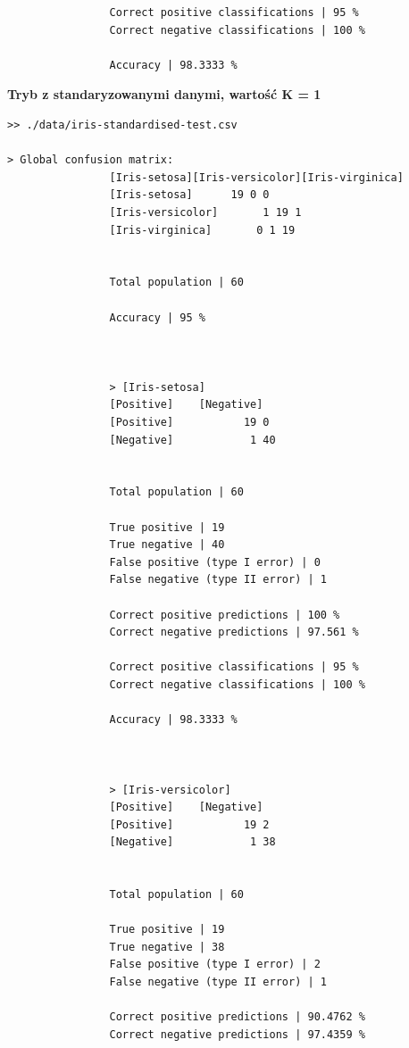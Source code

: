 \documentclass{classrep}
\begin{document}
{{{\begin{lstlisting}
                Correct positive classifications | 95 %
                Correct negative classifications | 100 %

                Accuracy | 98.3333 %

                \end{lstlisting}
                \textbf{Tryb z standaryzowanymi danymi, wartość K = 1}
                \begin{lstlisting}
>> ./data/iris-standardised-test.csv

> Global confusion matrix:
                [Iris-setosa][Iris-versicolor][Iris-virginica]
                [Iris-setosa]      19 0 0
                [Iris-versicolor]       1 19 1
                [Iris-virginica]       0 1 19


                Total population | 60

                Accuracy | 95 %



                > [Iris-setosa]
                [Positive]    [Negative]
                [Positive]           19 0
                [Negative]            1 40


                Total population | 60

                True positive | 19
                True negative | 40
                False positive (type I error) | 0
                False negative (type II error) | 1

                Correct positive predictions | 100 %
                Correct negative predictions | 97.561 %

                Correct positive classifications | 95 %
                Correct negative classifications | 100 %

                Accuracy | 98.3333 %



                > [Iris-versicolor]
                [Positive]    [Negative]
                [Positive]           19 2
                [Negative]            1 38


                Total population | 60

                True positive | 19
                True negative | 38
                False positive (type I error) | 2
                False negative (type II error) | 1

                Correct positive predictions | 90.4762 %
                Correct negative predictions | 97.4359 %


\end{lstlisting}}}}
\end{document}
